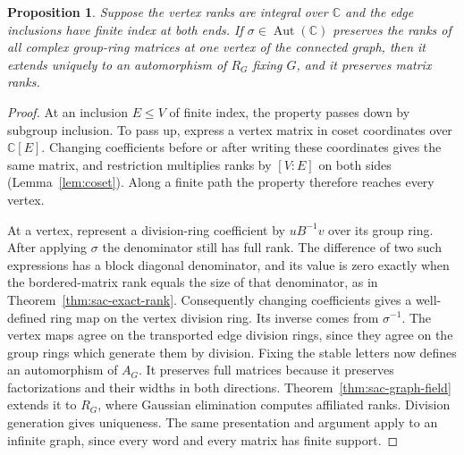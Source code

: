\documentclass[11pt,a4paper,reqno]{amsart}
\numberwithin{equation}{section}
\newtheorem{proposition}[theorem]{Proposition}
\theoremstyle{remark}
\newcommand{\C}{\mathbb C}
\newcommand{\Aut}{\operatorname{Aut}}
\begin{document}
\begin{proposition}\label{prop:coefficient-action}
Suppose the vertex ranks are integral over \(\C\) and the edge inclusions have finite index at both ends. If \(\sigma\in\Aut(\C)\) preserves the ranks of all complex group-ring matrices at one vertex of the connected graph, then it extends uniquely to an automorphism of \(R_G\) fixing \(G\), and it preserves matrix ranks.
\end{proposition}
\begin{proof}
At an inclusion \(E\le V\) of finite index, the property passes down by subgroup inclusion. To pass up, express a vertex matrix in coset coordinates over \(\C[E]\). Changing coefficients before or after writing these coordinates gives the same matrix, and restriction multiplies ranks by \([V:E]\) on both sides (Lemma~\ref{lem:coset}). Along a finite path the property therefore reaches every vertex.

At a vertex, represent a division-ring coefficient by \(uB^{-1}v\) over its group ring. After applying \(\sigma\) the denominator still has full rank. The difference of two such expressions has a block diagonal denominator, and its value is zero exactly when the bordered-matrix rank equals the size of that denominator, as in Theorem~\ref{thm:sac-exact-rank}. Consequently changing coefficients gives a well-defined ring map on the vertex division ring. Its inverse comes from \(\sigma^{-1}\). The vertex maps agree on the transported edge division rings, since they agree on the group rings which generate them by division. Fixing the stable letters now defines an automorphism of \(A_G\). It preserves full matrices because it preserves factorizations and their widths in both directions. Theorem~\ref{thm:sac-graph-field} extends it to \(R_G\), where Gaussian elimination computes affiliated ranks. Division generation gives uniqueness. The same presentation and argument apply to an infinite graph, since every word and every matrix has finite support.
\end{proof}
\end{document}
